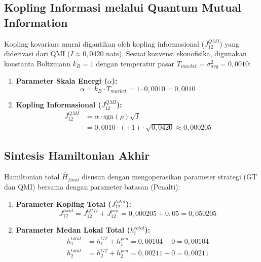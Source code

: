 \subsection{Kopling Informasi melalui Quantum Mutual Information}
Kopling kovarians murni digantikan oleh kopling informasional ($J_{12}^{QMI}$) yang diderivasi dari QMI ($I \approx 0,0420$ nats). Sesuai konvensi ekonofisika, digunakan konstanta Boltzmann $k_B = 1$ dengan temperatur pasar $T_{market} = \sigma_{avg}^2 = 0,0010$:
\begin{enumerate}
    \item \textbf{Parameter Skala Energi ($\alpha$):}
    \begin{equation}
    \alpha = k_B \cdot T_{market} = 1 \cdot 0,0010 = 0,0010
    \end{equation}
    \item \textbf{Kopling Informasional ($J_{12}^{QMI}$):}
    \begin{equation}
    \begin{aligned}
    J_{12}^{QMI} &= \alpha \cdot \text{sgn}(\rho) \sqrt{I} \\
    &= 0,0010 \cdot (+1) \cdot \sqrt{0,0420} \approx 0,000205
    \end{aligned}
    \end{equation}
\end{enumerate}

\subsection{Sintesis Hamiltonian Akhir}
Hamiltonian total $\hat{H}_{final}$ disusun dengan mengoperasikan parameter strategi (GT dan QMI) bersama dengan parameter batasan (Penalti):

\begin{enumerate}
    \item \textbf{Parameter Kopling Total ($J_{12}^{total}$):}
    \begin{equation}
    J_{12}^{total} = J_{12}^{QMI} + J_{12}^{pen} = 0,000205 + 0,05 = 0,050205
    \end{equation}
    \item \textbf{Parameter Medan Lokal Total ($h_i^{total}$):}
    \begin{align}
    h_1^{total} &= h_1^{GT} + h_1^{pen} = 0,00104 + 0 = 0,00104 \\
    h_2^{total} &= h_2^{GT} + h_2^{pen} = 0,00211 + 0 = 0,00211
    \end{align}
\end{enumerate}


